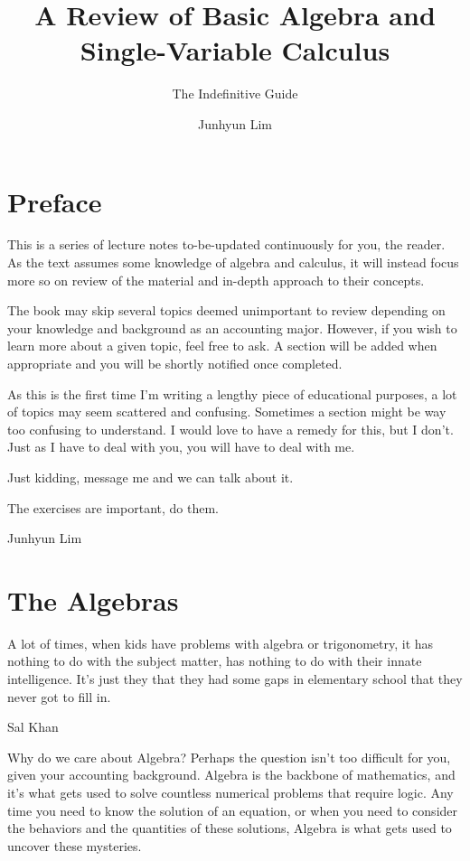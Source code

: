 \documentclass{scrbook}
\title{A Review of Basic Algebra and Single-Variable Calculus}
\subtitle{The Indefinitive Guide}
\author{Junhyun Lim}
\theoremstyle{definition}
\begin{document}
\maketitle

\tableofcontents

\chapter*{Preface}

This is a series of lecture notes to-be-updated continuously for you, the reader. As the text assumes some knowledge of algebra and calculus, it will instead focus more so on review of the material and in-depth approach to their concepts. 

The book may skip several topics deemed unimportant to review depending on your knowledge and background as an accounting major. However, if you wish to learn more about a given topic, feel free to ask. A section will be added when appropriate and you will be shortly notified once completed. 

As this is the first time I'm writing a lengthy piece of educational purposes, a lot of topics may seem scattered and confusing. Sometimes a section might be way too confusing to understand. I would love to have a remedy for this, but I don't. Just as I have to deal with you, you will have to deal with me. 

Just kidding, message me and we can talk about it.

The exercises are important, do them.

\vspace{10mm}

Junhyun Lim



\chapter{The Algebras}
\epigraph{A lot of times, when kids have problems with algebra or trigonometry, it has nothing to do with the subject matter, has nothing to do with their innate intelligence. It's just they that they had some gaps in elementary school that they never got to fill in.}{Sal Khan}

Why do we care about Algebra? Perhaps the question isn't too difficult for you, given your accounting background. Algebra is the backbone of mathematics, and it's what gets used to solve countless numerical problems that require logic. Any time you need to know the solution of an equation, or when you need to consider the behaviors and the quantities of these solutions, Algebra is what gets used to uncover these mysteries. 
\end{document}
